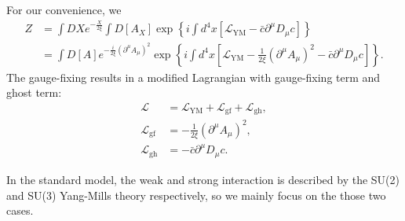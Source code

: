 For our convenience, we 
\begin{equation}
\begin{aligned}
	Z &= \int DX e^{-\frac{X}{2 \xi}}\int D[A_X] \exp\left\{i\int d^4x \left[\mathcal{L}_{\mathrm{YM}} - \bar c\partial^\mu D_\mu c \right]\right\} \\
	&= \int D[A] e^{-\frac{i}{2\xi}(\partial^\mu A_\mu)^2} \exp\left\{i\int d^4x \left[\mathcal{L}_{\mathrm{YM}} -\frac{1}{2\xi}(\partial^\mu A_\mu)^2 - \bar c\partial^\mu D_\mu c \right]\right\}.
\end{aligned}
\end{equation}
The gauge-fixing results in a modified Lagrangian with gauge-fixing term and ghost term:
\begin{equation}
\begin{aligned}
	\mathcal L &= \mathcal{L}_{\mathrm{YM}} + \mathcal{L}_{\mathrm{gf}} + \mathcal{L}_{\mathrm{gh}}, \\
	\mathcal{L}_{\mathrm{gf}} &= -\frac{1}{2\xi}(\partial^\mu A_\mu)^2, \\
	\mathcal{L}_{\mathrm{gh}} &= -\bar c\partial^\mu D_\mu c.
\end{aligned}
\end{equation}

In the standard model, the weak and strong interaction is described by the SU(2) and SU(3) Yang-Mills theory respectively, so we mainly focus on the those two cases.


